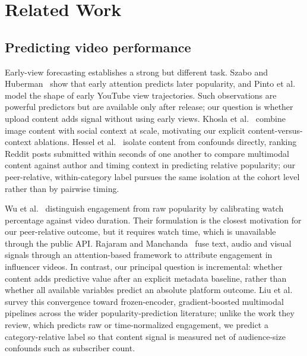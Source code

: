 \documentclass[letterpaper]{article}
\begin{document}
\section{Related Work}

\subsection{Predicting video performance}
Early-view forecasting establishes a strong but different task. Szabo and
Huberman~\cite{szabo2010predicting} show that early attention predicts later
popularity, and Pinto et al.~\cite{pinto2013early} model the shape of early
YouTube view trajectories. Such observations are powerful predictors but are
available only after release; our question is whether upload content adds
signal without using early views. Khosla et al.~\cite{khosla2014image}
combine image content with social context at scale, motivating our explicit
content-versus-context ablations. Hessel et al.~\cite{hessel2017cats} isolate
content from confounds directly, ranking Reddit posts submitted within seconds
of one another to compare multimodal content against author and timing context
in predicting relative popularity; our peer-relative, within-category label
pursues the same isolation at the cohort level rather than by pairwise timing.

Wu et al.~\cite{wu2018beyond} distinguish engagement from raw popularity by
calibrating watch percentage against video duration. Their formulation is the
closest motivation for our peer-relative outcome, but it requires watch time,
which is unavailable through the public API. Rajaram and
Manchanda~\cite{rajaram2020unboxing} fuse text, audio and visual signals
through an attention-based framework to attribute engagement in influencer
videos. In contrast, our principal question is incremental: whether content
adds predictive value after an explicit metadata baseline, rather than whether
all available variables predict an absolute platform outcome. Liu et
al.~\cite{liu2026survey} survey this convergence toward frozen-encoder,
gradient-boosted multimodal pipelines across the wider popularity-prediction
literature; unlike the work they review, which predicts raw or time-normalized
engagement, we predict a category-relative label so that content signal is
measured net of audience-size confounds such as subscriber count.
\end{document}
